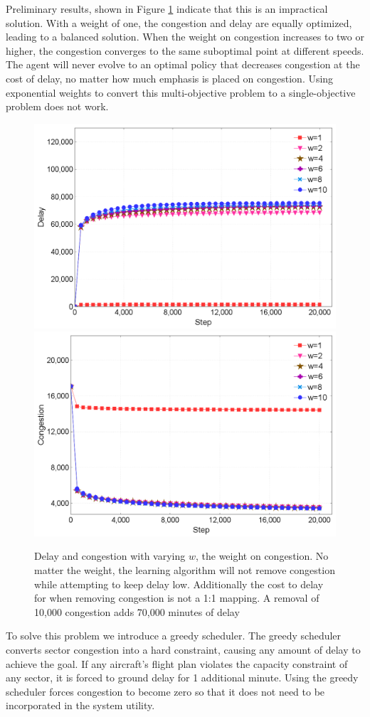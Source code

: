 \documentclass{aamas2014}
\begin{document}
Preliminary results, shown in Figure \ref{delayCongestionPower} indicate that this is an impractical solution. With a weight of one, the congestion and delay are equally optimized, leading to a balanced solution. When the weight on congestion increases to two or higher, the congestion converges to the same suboptimal point at different speeds. The agent will never evolve to an optimal policy that decreases congestion at the cost of delay, no matter how much emphasis is placed on congestion. Using exponential weights to convert this multi-objective problem to a single-objective problem does not work.

\begin{figure}[]
\centering
\includegraphics[width=.75\columnwidth]{delayPower}
\includegraphics[width=.75\columnwidth]{congestionPower}
\caption{Delay and congestion with varying $w$, the weight on congestion. No matter the weight, the learning algorithm will not remove congestion while attempting to keep delay low. Additionally the cost to delay for when removing congestion is not a 1:1 mapping. A removal of 10,000 congestion adds 70,000 minutes of delay}
\label{delayCongestionPower}
\end{figure}

To solve this problem we introduce a greedy scheduler. The greedy scheduler converts sector congestion into a hard constraint, causing any amount of delay to achieve the goal. If any aircraft's flight plan violates the capacity constraint of any sector, it is forced to ground delay for 1 additional minute. Using the greedy scheduler forces congestion to become zero so that it does not need to be incorporated in the system utility.
\end{document}

